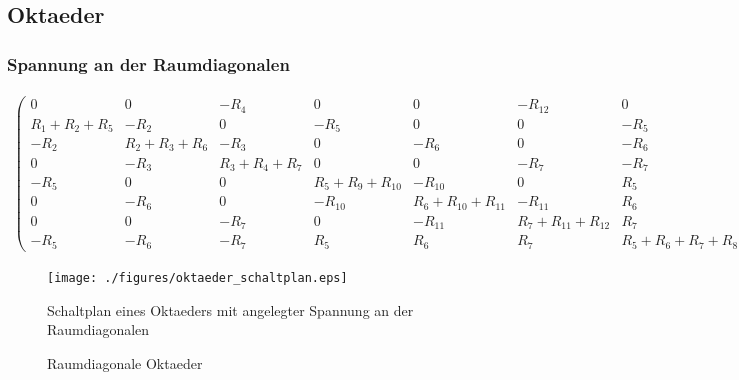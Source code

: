 \documentclass[10pt,a4paper]{article}
\begin{document}
\begin{landscape}
\subsection{Oktaeder}
\subsubsection{Spannung an der Raumdiagonalen}
\begin{align}
\begin{pmatrix}
	0 & 0 & -R_4 & 0 & 0 & -R_{12} & 0 & R_4 + R_{12} \\
	R_1 + R_2 + R_5 & -R_2 & 0 & -R_5 & 0 & 0 &-R_5 & 0 \\
	-R_2 & R_2 + R_3 + R_6 & -R_3 & 0 & -R_6 & 0 & -R_6 & 0 \\
	0 & -R_3 & R_3 + R_4 + R_7 & 0 & 0 & -R_7 & -R_7 & -R_4 \\
	-R_5 & 0 & 0 & R_5 + R_9 + R_{10} & -R_{10} & 0 & R_5 & 0 \\
	0 & -R_6 & 0 & -R_{10} & R_6 + R_{10} + R_{11} & -R_{11} & R_6 & 0 \\
	0 & 0 & -R_7 & 0 & -R_{11} & R_7 + R_{11} + R_{12} & R_7 & -R_{12} \\
	-R_5 & -R_6 & -R_7 & R_5 & R_6 & R_7 & R_5 + R_6 + R_7 + R_8 & 0
\end{pmatrix}
\begin{pmatrix}
I_1\\ I_2\\ I_3\\I_4\\I_5\\I_6\\I_7\\I_{ges}
\end{pmatrix}
=
\begin{pmatrix}
U\\0\\0\\0\\0\\0\\0\\0
\end{pmatrix}
\label{eqn:oktaeder_ganz}
\end{align}
\begin{figure}[htbp!]
\centering
\texttt{[image: ./figures/oktaeder\_schaltplan.eps]}
\caption{Schaltplan eines Oktaeders mit angelegter Spannung an der Raumdiagonalen}
\label{fig:oktaeder_schaltplan}
\end{figure}
\thispagestyle{empty}
\end{landscape}
\begin{figure}[htbp!]
\centering

\caption{Raumdiagonale Oktaeder}
\end{figure}
\thispagestyle{empty}
\newpage
\end{document}
